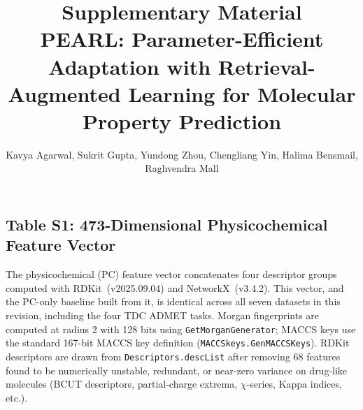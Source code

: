 \documentclass[9pt,a4paper]{article}
\title{\textbf{Supplementary Material}\\[4pt]
{\large PEARL: Parameter-Efficient Adaptation with
Retrieval-Augmented Learning for Molecular Property Prediction}}
\author{Kavya Agarwal, Sukrit Gupta, Yundong Zhou, Chengliang Yin, Halima Bensmail, Raghvendra Mall}
\date{}
\begin{document}
\maketitle
\tableofcontents
\newpage



\subsection*{Table S1: 473-Dimensional Physicochemical Feature Vector}

The physicochemical (PC) feature vector concatenates four descriptor groups computed
with RDKit~(v2025.09.04) and NetworkX~(v3.4.2). This vector, and the PC-only baseline built from it,
is identical across all seven datasets in this revision, including the four TDC
ADMET tasks.
Morgan fingerprints are computed at radius 2 with 128 bits using
\texttt{GetMorganGenerator}; MACCS keys use the standard 167-bit MACCS key
definition (\texttt{MACCSkeys.GenMACCSKeys}).
RDKit descriptors are drawn from \texttt{Descriptors.descList} after removing
68 features found to be numerically unstable, redundant, or near-zero variance
on drug-like molecules (BCUT descriptors, partial-charge extrema, $\chi$-series,
Kappa indices, etc.).
\end{document}
